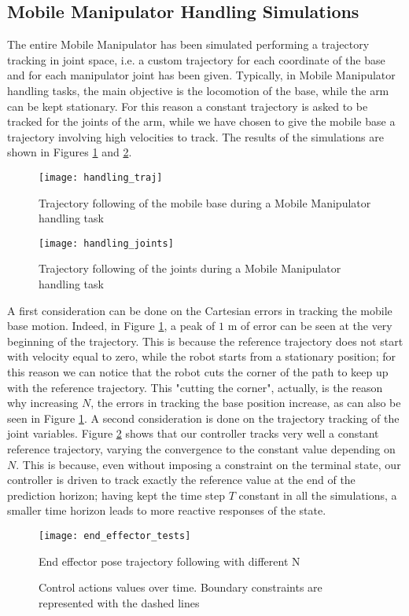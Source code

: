 \subsection{Mobile Manipulator Handling Simulations}
The entire Mobile Manipulator has been simulated performing a trajectory tracking in joint space, i.e. a custom trajectory for each coordinate of the base and for each manipulator joint has been given. Typically, in Mobile Manipulator handling tasks, the main objective is the locomotion of the base, while the arm can be kept stationary. For this reason a constant trajectory is asked to be tracked for the joints of the arm, while we have chosen to give the mobile base a trajectory involving high velocities to track. The results of the simulations are shown in Figures \ref{handling_traj} and \ref{handling_joints}. 
\begin{figure}[p]
\centering
\texttt{[image: handling\_traj]}
\caption{Trajectory following of the mobile base during a Mobile Manipulator handling task}
\label{handling_traj}
\end{figure}
\begin{figure}[p]
\centering
\texttt{[image: handling\_joints]}
\caption{Trajectory following of the joints during a Mobile Manipulator handling task}
\label{handling_joints}
\end{figure}
A first consideration can be done on the Cartesian errors in tracking the mobile base motion. Indeed, in Figure \ref{handling_traj}, a peak of $1$ m of error can be seen at the very beginning of the trajectory. This is because the reference trajectory does not start with velocity equal to zero, while the robot starts from a stationary position; for this reason we can notice that the robot cuts the corner of the path to keep up with the reference trajectory. This "cutting the corner", actually, is the reason why increasing $N$, the errors in tracking the base position increase, as can also be seen in Figure \ref{handling_traj}. A second consideration is done on the trajectory tracking of the joint variables. Figure \ref{handling_joints} shows that our controller tracks very well a constant reference trajectory, varying the convergence to the constant value depending on $N$. This is because, even without imposing a constraint on the terminal state, our controller is driven to track exactly the reference value at the end of the prediction horizon; having kept the time step $T$ constant in all the simulations, a smaller time horizon leads to more reactive responses of the state.
\begin{figure}[p]
\centering
\texttt{[image: end\_effector\_tests]}
\caption{End effector pose trajectory following with different N }
\label{end_effector_tests}
\end{figure}
\begin{figure}[p]
\centering
{}
\caption{Control actions values over time. Boundary constraints are represented with the dashed lines}
\label{control_actions_SIM}
\end{figure}
